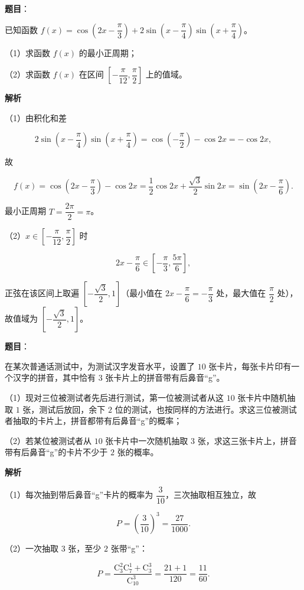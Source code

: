 \begin{answer}

\textbf{题目}：

已知函数 $f(x)=\cos\left(2x-\dfrac{\pi}{3}\right)+2\sin\left(x-\dfrac{\pi}{4}\right)\sin\left(x+\dfrac{\pi}{4}\right)$。

（1）求函数 $f(x)$ 的最小正周期；

（2）求函数 $f(x)$ 在区间 $\left[-\dfrac{\pi}{12},\dfrac{\pi}{2}\right]$ 上的值域。

\textbf{解析}

（1）由积化和差

\nopagebreak[4]
\[2\sin\left(x-\frac{\pi}4\right)\sin\left(x+\frac{\pi}4\right)=\cos\left(-\frac{\pi}2\right)-\cos2x=-\cos2x,\]

故

\nopagebreak[4]
\[f(x)=\cos\left(2x-\frac{\pi}3\right)-\cos2x=\frac12\cos2x+\frac{\sqrt3}2\sin2x=\sin\left(2x-\frac{\pi}6\right).\]

最小正周期 $T=\dfrac{2\pi}2=\pi$。

（2）$x\in\left[-\dfrac{\pi}{12},\dfrac{\pi}{2}\right]$ 时

\nopagebreak[4]
\[2x-\frac{\pi}6\in\left[-\frac{\pi}3,\frac{5\pi}6\right],\]

正弦在该区间上取遍 $\left[-\dfrac{\sqrt3}2,1\right]$（最小值在 $2x-\dfrac{\pi}6=-\dfrac{\pi}3$ 处，最大值在 $\dfrac{\pi}2$ 处），故值域为 $\left[-\dfrac{\sqrt3}2,1\right]$。


\end{answer}
\begin{answer}

\textbf{题目}：

在某次普通话测试中，为测试汉字发音水平，设置了 $10$ 张卡片，每张卡片印有一个汉字的拼音，其中恰有 $3$ 张卡片上的拼音带有后鼻音“g”。

（1）现对三位被测试者先后进行测试，第一位被测试者从这 $10$ 张卡片中随机抽取 $1$ 张，测试后放回，余下 $2$ 位的测试，也按同样的方法进行。求这三位被测试者抽取的卡片上，拼音都带有后鼻音“g”的概率；

（2）若某位被测试者从 $10$ 张卡片中一次随机抽取 $3$ 张，求这三张卡片上，拼音带有后鼻音“g”的卡片不少于 $2$ 张的概率。

\textbf{解析}

（1）每次抽到带后鼻音“g”卡片的概率为 $\dfrac3{10}$，三次抽取相互独立，故

\nopagebreak[4]
\[P=\left(\frac3{10}\right)^3=\frac{27}{1000}.\]

（2）一次抽取 $3$ 张，至少 $2$ 张带“g”：

\nopagebreak[4]
\[P=\frac{\mathrm C_3^2\mathrm C_7^1+\mathrm C_3^3}{\mathrm C_{10}^3}=\frac{21+1}{120}=\frac{11}{60}.\]


\end{answer}
